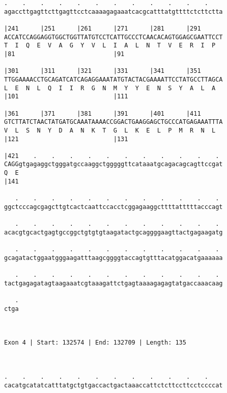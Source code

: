 \documentclass{article}
\begin{document}
\begin{Verbatim}
.    .    .    .    .    .    .    .    .    .    .    .    
agaccttgagttcttgagttcctcaaaagagaaatcacgcatttatgttttctcttctta
                                                            
|241      |251      |261      |271      |281      |291      
ACCATCCAGGAGGTGGCTGGTTATGTCCTCATTGCCCTCAACACAGTGGAGCGAATTCCT
T  I  Q  E  V  A  G  Y  V  L  I  A  L  N  T  V  E  R  I  P  
|81                           |91                           
  
|301      |311      |321      |331      |341      |351      
TTGGAAAACCTGCAGATCATCAGAGGAAATATGTACTACGAAAATTCCTATGCCTTAGCA
L  E  N  L  Q  I  I  R  G  N  M  Y  Y  E  N  S  Y  A  L  A  
|101                          |111                          
  
|361      |371      |381      |391      |401      |411      
GTCTTATCTAACTATGATGCAAATAAAACCGGACTGAAGGAGCTGCCCATGAGAAATTTA
V  L  S  N  Y  D  A  N  K  T  G  L  K  E  L  P  M  R  N  L  
|121                          |131                          
  
|421    .    .    .    .    .    .    .    .    .    .    . 
CAGGgtgagaggctgggatgccaaggctgggggttcataaatgcagacagcagttccgat
Q  E                                                        
|141                                                        
  
   .    .    .    .    .    .    .    .    .    .    .    . 
ggctcccagcgagcttgtcactcaattccacctcggagaaggcttttatttttacccagt
                                                            
   .    .    .    .    .    .    .    .    .    .    .    . 
acacgtgcactgagtgccggctgtgtgtaagatactgcaggggaagttactgagaagatg
                                                            
   .    .    .    .    .    .    .    .    .    .    .    . 
gcagatactggaatgggaagatttaagcggggtaccagtgtttacatggacatgaaaaaa
                                                            
   .    .    .    .    .    .    .    .    .    .    .    . 
tactgagagatagtaagaaatcgtaaagattctgagtaaaagagagtatgaccaaacaag
                                                            
   .
ctga
    
    
 
Exon 4 | Start: 132574 | End: 132709 | Length: 135



.    .    .    .    .    .    .    .    .    .    .    .    
cacatgcatatcatttatgctgtgaccactgactaaaccattctcttccttcctccccat
                                                            

\end{Verbatim}
\end{document}

